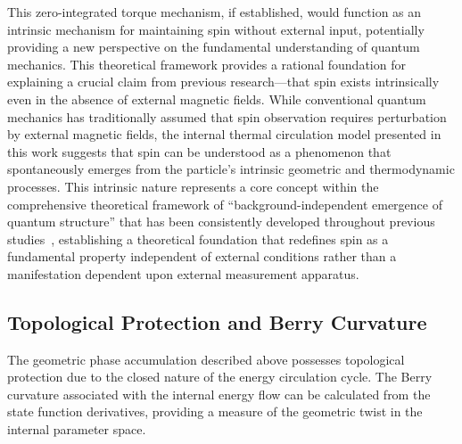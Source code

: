 \documentclass[%
 reprint,
 amsmath,amssymb,
 aps,
]{revtex4-1}
\numberwithin{equation}{section}%
\begin{document}
This zero-integrated torque mechanism, if established, would function as an intrinsic mechanism for maintaining spin without external input, potentially providing a new perspective on the fundamental understanding of quantum mechanics. This theoretical framework provides a rational foundation for explaining a crucial claim from previous research---that spin exists intrinsically even in the absence of external magnetic fields. While conventional quantum mechanics has traditionally assumed that spin observation requires perturbation by external magnetic fields, the internal thermal circulation model presented in this work suggests that spin can be understood as a phenomenon that spontaneously emerges from the particle's intrinsic geometric and thermodynamic processes. This intrinsic nature represents a core concept within the comprehensive theoretical framework of ``background-independent emergence of quantum structure'' that has been consistently developed throughout previous studies~\cite{hanamura2506.0072,hanamura2506.0157}, establishing a theoretical foundation that redefines spin as a fundamental property independent of external conditions rather than a manifestation dependent upon external measurement apparatus.


\subsection{Topological Protection and Berry Curvature} \label{subsec:topological_protection}

The geometric phase accumulation described above possesses topological protection due to the closed nature of the energy circulation cycle. The Berry curvature associated with the internal energy flow can be calculated from the state function derivatives, providing a measure of the geometric twist in the internal parameter space.
\end{document}
